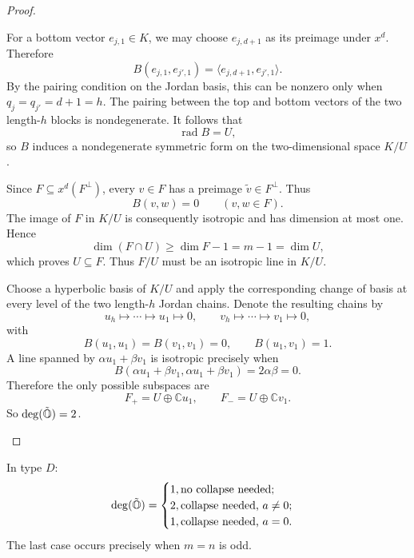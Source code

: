 \begin{proof}
\begin{itemize}
      For a bottom vector $e_{j,1}\in K$, we may choose
      $e_{j,d+1}$ as its preimage under $x^d$. Therefore
      \[
        B(e_{j,1},e_{j',1})
        =
        \langle e_{j,d+1},e_{j',1}\rangle.
      \]
      By the pairing condition on the Jordan basis,
      this can be nonzero only when
      $q_j=q_{j'}=d+1=h$.
      The pairing between the top and bottom vectors
      of the two length-$h$ blocks is nondegenerate.
      It follows that
      \[
        \operatorname{rad}B=U,
      \]
      so $B$ induces a nondegenerate symmetric form
      on the two-dimensional space $K/U$.

      Since $F\subseteq x^d(F^\perp)$, every $v\in F$
      has a preimage $\widetilde v\in F^\perp$.
      Thus
      \[
        B(v,w)=0\qquad(v,w\in F).
      \]
      The image of $F$ in $K/U$ is consequently isotropic
      and has dimension at most one. Hence
      \[
        \dim(F\cap U)\ge\dim F-1=m-1=\dim U,
      \]
      which proves $U\subseteq F$.
      Thus $F/U$ must be an isotropic line in $K/U$.

      Choose a hyperbolic basis of $K/U$ and apply
      the corresponding change of basis at every level
      of the two length-$h$ Jordan chains. Denote
      the resulting chains by
      \[
        u_h\mapsto\cdots\mapsto u_1\mapsto0,
        \qquad
        v_h\mapsto\cdots\mapsto v_1\mapsto0,
      \]
      with
      \[
        B(u_1,u_1)=B(v_1,v_1)=0,
        \qquad B(u_1,v_1)=1.
      \]
      A line spanned by $\alpha u_1+\beta v_1$ is
      isotropic precisely when
      \[
        B(\alpha u_1+\beta v_1,
          \alpha u_1+\beta v_1)=2\alpha\beta=0.
      \]
      Therefore the only possible subspaces are
      \[
        F_+=U\oplus\mathbb C u_1,
        \qquad
        F_-=U\oplus\mathbb C v_1.
      \]
      So $\deg(\tilde{\mathbb{O}})=2$.
  \end{itemize}
\end{proof}

\begin{prop}
  In type $D$:
  \[
    \deg(\tilde{\mathbb{O}}) = 
    \begin{cases}
      1, \text{no collapse needed};\\
      2, \text{collapse needed, $a \neq 0$};\\
      1, \text{collapse needed, $a = 0$}.
    \end{cases}
  \]
  The last case occurs precisely when $m=n$ is odd.
\end{prop}

